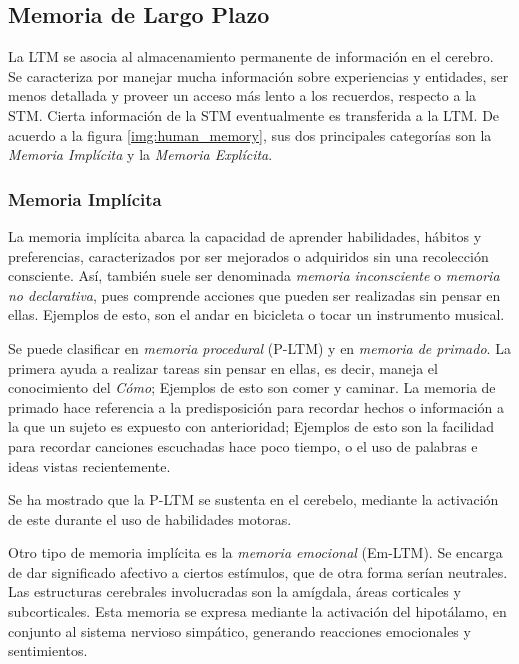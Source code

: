 \subsection{Memoria de Largo Plazo}

La LTM se asocia al almacenamiento permanente de información en el cerebro. Se caracteriza por manejar mucha información sobre experiencias y entidades, ser menos detallada y proveer un acceso más lento a los recuerdos, respecto a la STM\cite{Eichenbaum:2008}. Cierta información de la STM eventualmente es transferida a la LTM. De acuerdo a la figura \ref{img:human_memory}, sus dos principales categorías son la \textit{Memoria Implícita} y la \textit{Memoria Explícita}.

\subsubsection{Memoria Implícita}

La memoria implícita  abarca la capacidad de aprender habilidades, hábitos y preferencias, caracterizados por ser mejorados o adquiridos sin una recolección consciente. Así, también suele ser denominada \textit{memoria inconsciente} o \textit{memoria no declarativa}, pues comprende acciones que pueden ser realizadas sin pensar en ellas. Ejemplos de esto, son el andar en bicicleta o tocar un instrumento musical.

Se puede clasificar en \textit{memoria procedural} (P-LTM) y en \textit{memoria de primado}. La primera ayuda a realizar tareas sin pensar en ellas, es decir, maneja el conocimiento del \textit{Cómo}; Ejemplos de esto son comer y caminar. La memoria de primado hace referencia a la predisposición para recordar hechos o información a la que un sujeto es expuesto con anterioridad; Ejemplos de esto son la facilidad para recordar canciones escuchadas hace poco tiempo, o el uso de palabras e ideas vistas recientemente.

Se ha mostrado que la P-LTM se sustenta en el cerebelo, mediante la activación de este durante el uso de habilidades motoras.

Otro tipo de memoria implícita es la \textit{memoria emocional} (Em-LTM). Se encarga de dar significado afectivo a ciertos  estímulos, que de otra forma serían neutrales. Las estructuras cerebrales involucradas son la amígdala, áreas corticales y subcorticales. Esta memoria se expresa mediante la activación del hipotálamo, en conjunto al sistema nervioso simpático, generando reacciones emocionales y sentimientos.


